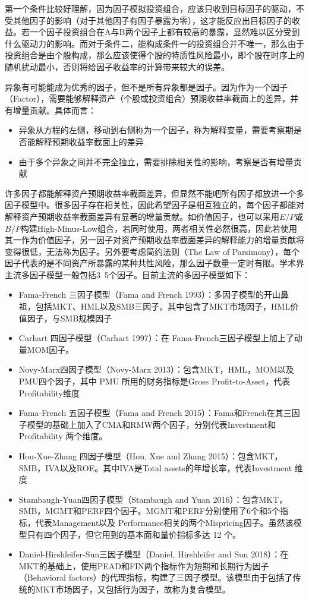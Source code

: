 \documentclass[11pt]{article}
\begin{document}
第一个条件比较好理解，因为因子模拟投资组合，应该只收到目标因子的驱动，不受其他因子的影响（对于其他因子有因子暴露为零），这才能反应出目标因子的收益。若一个因子投资组合在A与B两个因子上都有较高的暴露，显然难以区分受到什么驱动力的影响。而对于条件二，能构成条件一的投资组合并不唯一，那么由于投资组合是由个股构成，那么应该使得个股的特质性风险最小，即个股在时序上的随机扰动最小，否则将给因子收益率的计算带来较大的误差。

异象有可能能成为优秀的因子，但不是所有异象都是因子。因为作为一个因子（Factor），需要能够解释资产（个股或投资组合）预期收益率截面上的差异，并有增量贡献。具体而言：
\begin{itemize}
    \item 异象从方程的左侧，移动到右侧称为一个因子，称为解释变量，需要考察期是否能解释预期收益率截面上的差异
    \item 由于多个异象之间并不完全独立，需要排除相关性的影响，考察是否有增量贡献
\end{itemize}

许多因子都能解释资产预期收益率截面差异，但显然不能吧所有因子都放进一个多因子模型中。很多因子存在相关性，因此希望因子是相互独立的，每个因子都能对解释资产预期收益率截面差异有显著的增量贡献。如价值因子，也可以采用$E/P$或$B/P$构建High-Minus-Low组合，若同时使用，两者相关性必然很高，因此若使用其一作为价值因子，另一因子对资产预期收益率截面差异的解释能力的增量贡献将变得很低，无法称为因子。另外要考虑简约法则（The Law of Parsimony），每个因子代表的是不同资产所暴露的某种共性风险，那么因子数量一定时有限。学术界主流多因子模型一般包括3~5个因子。目前主流的多因子模型如下：
\begin{itemize}
    \item Fama-French 三因子模型（Fama and French 1993）：多因子模型的开山鼻祖，包括MKT、HML以及SMB三因子。其中包含了MKT市场因子，HML价值因子，与SMB规模因子
    \item Carhart 四因子模型（Carhart 1997）：在 Fama-French三因子模型上加上了动量MOM因子。
    \item Novy-Marx四因子模型（Novy-Marx 2013）：包含MKT，HML，MOM以及PMU四个因子，其中 PMU 所用的财务指标是Gross Profit-to-Asset，代表Profitability维度
    \item Fama-French 五因子模型（Fama and French 2015）：Fama和French在其三因子模型的基础上加入了CMA和RMW两个因子，分别代表Investment和Profitability 两个维度。
    \item Hou-Xue-Zhang 四因子模型（Hou, Xue and Zhang 2015）：包含MKT，SMB，IVA以及ROE。其中IVA是Total assets的年增长率，代表Investment 维度
    \item Stambaugh-Yuan四因子模型（Stambaugh and Yuan 2016）：包含MKT，SMB，MGMT和PERF四个因子。MGMT和PERF分别使用了6个和5个指标，代表Management以及 Performance相关的两个Mispricing因子。虽然该模型只有四个因子，但它用到的基本面和量价指标多达 12 个。
    \item Daniel-Hirshleifer-Sun三因子模型（Daniel, Hirshleifer and Sun 2018）：在MKT的基础上，使用PEAD和FIN两个指标作为短期和长期行为因子（Behavioral factors）的代理指标，构建了三因子模型。该模型由于包括了传统的MKT市场因子，又包括行为因子，故称为复合模型。
\end{itemize}
\end{document}
